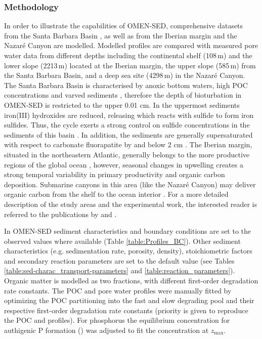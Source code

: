 \documentclass[gmd, manuscript]{copernicus}
\begin{document}
\subsubsection{Methodology}
In order to illustrate the capabilities of OMEN-SED, comprehensive datasets from the Santa Barbara Basin \citep{reimers_porewater_1996}, as well as from the Iberian margin and the Nazar\'e Canyon \citep{epping_oxidation_2002} 
are modelled. Modelled profiles are compared with measured pore water data from different depths including the continental shelf (108\,m) and the lower slope (2213\,m) located at the Iberian margin,
the upper slope (585\,m) from the Santa Barbara Basin, and a deep sea site (4298\,m) in the Nazar\'e Canyon. 
The Santa Barbara Basin is characterised by anoxic bottom waters, high POC concentrations and varved sediments \citep{reimers_seasonal_1990}, therefore the depth of bioturbation in OMEN-SED 
is restricted to the upper 0.01 cm. In the uppermost sediments iron(III) hydroxides are reduced, releasing  which reacts with sulfide to form iron sulfides. 
Thus, the  cycle exerts a strong control on sulfide concentrations in the sediments of this basin \citep{reimers_porewater_1996}. 
In addition, the sediments are generally supersaturated with respect to carbonate fluorapatite by and below 2 cm \citep{reimers_porewater_1996}. 
The Iberian margin, situated in the northeastern Atlantic, generally belongs to the more productive regions of the global ocean \citep{longhurst_estimate_1995}, however, seasonal changes in upwelling creates a strong temporal variability in 
primary productivity and organic carbon deposition. Submarine canyons in this area (like the Nazar\'e Canyon) may deliver organic carbon from the shelf to the ocean interior \citep{van_weering_recent_2002, epping_oxidation_2002}.
For a more detailed description of the study areas and the experimental work, the interested reader is referred to the publications by \citet{reimers_porewater_1996} and \citet{epping_oxidation_2002}. 

In OMEN-SED sediment characteristics and boundary conditions are set to the observed values where available (Table \ref{table:Profiles_BC}). Other sediment characteristics (e.g. sedimentation rate, porosity, density), 
stoichiometric factors and secondary reaction parameters are set to the default value (see Tables \ref{table:sed-charac_transport-parameters} and \ref{table:reaction_parameters}).
Organic matter is modelled as two fractions, with different first-order degradation rate constants. 
The POC and pore water profiles were manually fitted by optimizing the POC partitioning into the fast and slow degrading pool and their respective first-order degradation rate constants (priority is given to reproduce the POC 
and  profiles). For phosphorus the equilibrium concentration for authigenic P formation () was adjusted to fit the  concentration at $z_\mathrm{max}$. 
\end{document}
